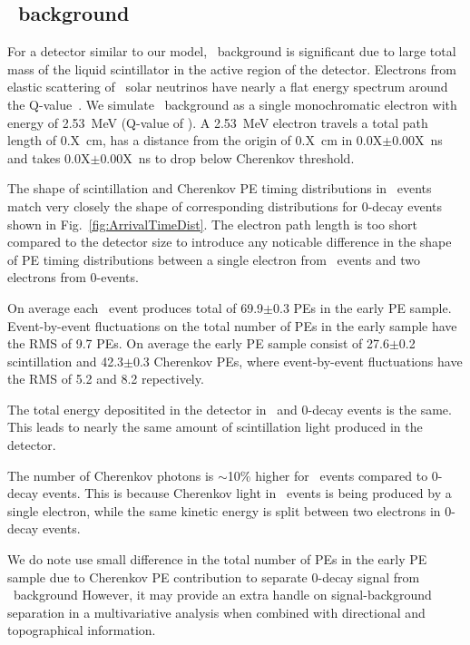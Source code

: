 \subsection{\B~background}

For a detector similar to our model, \B~background is significant due to large total mass of the liquid scintillator in
the active region of the detector.
Electrons from elastic scattering of \B~solar neutrinos have nearly a flat energy spectrum around the 
Q-value~\cite{SNOp-B8-bkg}. We simulate \B~background as a single monochromatic electron with energy of 2.53~MeV 
(Q-value of \Te). A 2.53~MeV electron travels a total path length of 0.X~cm, has a distance from the origin of 0.X~cm in 
0.0X$\pm$0.00X~ns  and takes 0.0X$\pm$0.00X~ns to drop below Cherenkov threshold.

The shape of scintillation and Cherenkov PE timing distributions in \B~events match very closely the shape of corresponding distributions
for 0\nbb-decay events shown in Fig.~\ref{fig:ArrivalTimeDist}. The electron path length is too short compared to the detector size to 
introduce any noticable difference in the shape of PE timing distributions between a single electron from \B~events and two 
electrons from 0\nbb-events.


On average each \B~event produces total of 69.9$\pm$0.3 PEs in the early PE sample.
Event-by-event fluctuations on the total number of PEs in the early sample have the RMS of 9.7 PEs.
On average the early PE sample consist of 27.6$\pm$0.2 scintillation and 42.3$\pm$0.3 Cherenkov PEs, where event-by-event fluctuations have
the RMS of 5.2 and 8.2 repectively.

The total energy depositited in the detector in \B~and 0\nbb-decay events is the same. This leads to nearly the same amount of 
scintillation light produced in the detector. 

The number of Cherenkov photons is $\sim$10\% higher for \B~events compared to 0\nbb-decay events. This is because Cherenkov 
light in \B~events is being produced by a single electron, while the same kinetic energy is split between two electrons 
in 0\nbb-decay events. 

We do note use small difference in the total number of PEs in the early PE sample due to Cherenkov PE contribution 
to separate 0\nbb-decay signal from \B~background However, it may provide an extra handle on signal-background separation in a 
multivariative analysis when combined with directional and topographical information.

